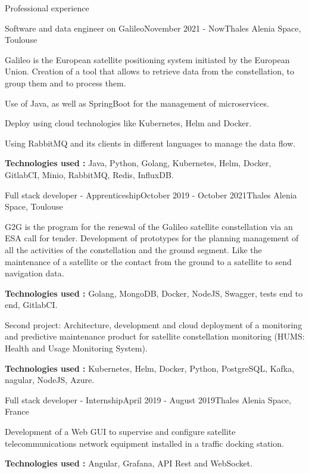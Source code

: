 \documentclass[
	11pt, %
]{resume}
\begin{document}
\begin{rSection}{Professional experience}

	\begin{rSubsection}{Software and data engineer on Galileo}{November 2021 - Now}{Thales Alenia Space, Toulouse}{}
		\item Galileo is the European satellite positioning system initiated by the European Union. 
		Creation of a tool that allows to retrieve data from the constellation, to group them and to process them.
 		\item Use of Java, as well as SpringBoot for the management of microservices.
 		\item Deploy using cloud technologies like Kubernetes, Helm and Docker.
 		\item Using RabbitMQ and its clients in different languages to manage the data flow.
		\item \textbf{Technologies used :} Java, Python, Golang, Kubernetes, Helm, Docker, GitlabCI, Minio, RabbitMQ, Redis, InfluxDB.
	\end{rSubsection}

	\begin{rSubsection}{Full stack developer - Apprenticeship}{October 2019 - October 2021}{Thales Alenia Space, Toulouse}{}
		\item G2G is the program for the renewal of the Galileo satellite constellation via an ESA call for tender. 
			Development of prototypes for the planning management of all the activities of the constellation and the ground segment. 
			Like the maintenance of a satellite or the contact from the ground to a satellite to send navigation data.
		\item \textbf{Technologies used :} Golang, MongoDB, Docker, NodeJS, Swagger, tests end to end, GitlabCI.
		\item Second project: Architecture, development and cloud deployment of a monitoring and predictive maintenance 
			product for satellite constellation monitoring (HUMS: Health and Usage Monitoring System).
		\item \textbf{Technologies used :} Kubernetes, Helm, Docker, Python, PostgreSQL, Kafka, nagular, NodeJS, Azure.
	\end{rSubsection}

	\begin{rSubsection}{Full stack developer - Internship}{April 2019 - August 2019}{Thales Alenia Space, France}{}
		\item Development of a Web GUI to supervise and configure satellite telecommunications network equipment installed in a traffic docking station.
		\item \textbf{Technologies used :} Angular, Grafana, API Rest and WebSocket.
	\end{rSubsection}


\end{rSection}
\end{document}
